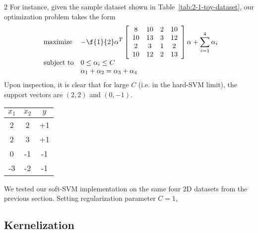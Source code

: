 \documentclass{article}
\begin{document}
\begin{multicols}{2}
For instance, given the sample dataset shown
in Table~\ref{tab:2-1-toy-dataset},
our optimization problem takes the form
\begin{equation}
    \label{eq:soft-svm-dual-concrete}
    \begin{array}{ll@{}ll}
        \text{maximize}  &\displaystyle -\f{1}{2}\alpha^T
        \left[
            \begin{array}{cccc}
                8 & 10 & 2 & 10 \\
                10 & 13 & 3 & 12 \\
                2 & 3 & 1 & 2 \\
                10 & 12 & 2 & 13
            \end{array}
        \right]
        \alpha
        +
        \sum_{i=1}^4 \alpha_i \\
        \text{subject to}& 0 \le \alpha_i \le C\\
        & \alpha_1 + \alpha_2 = \alpha_3 + \alpha_4
    \end{array}
\end{equation}
Upon inspection,
it is clear that for large $C$
(i.e. in the hard-SVM limit),
the support vectors are $(2,2)$ and $(0,-1)$.

\begin{table*}[h]
    \caption{default}
    \begin{center}
    \begin{tabular}{|c|c|c|}
    $x_1$ & $x_2$ & $y$ \\\hline
    2 & 2 & +1 \\
    2 & 3 & +1 \\
    0 & -1 & -1 \\
    -3 & -2 & -1
    \end{tabular}
    \end{center}
    \label{tab:2-1-toy-dataset}
\end{table*}

We tested our soft-SVM implementation
on the same four 2D datasets from the previous section.
Setting regularization parameter $C=1$,




\subsection{Kernelization}


\end{multicols}
\end{document}
